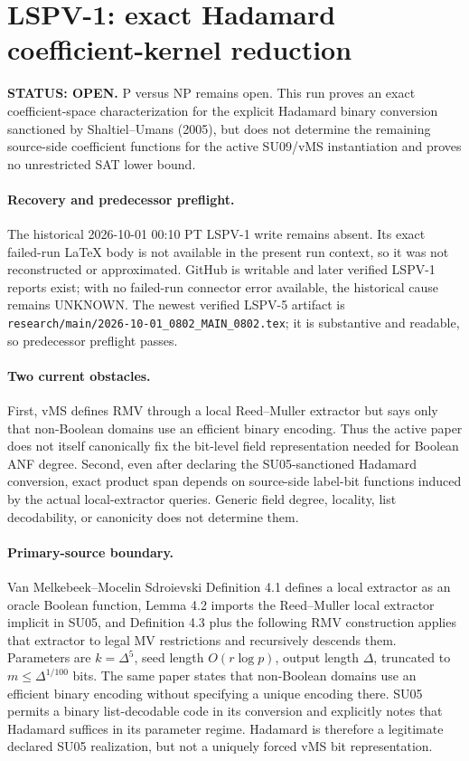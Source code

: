 \documentclass[11pt]{article}
\begin{document}
\section*{LSPV-1: exact Hadamard coefficient-kernel reduction}

\textbf{STATUS: OPEN.} P versus NP remains open. This run proves an exact coefficient-space characterization for the explicit Hadamard binary conversion sanctioned by Shaltiel--Umans (2005), but does not determine the remaining source-side coefficient functions for the active SU09/vMS instantiation and proves no unrestricted SAT lower bound.

\paragraph{Recovery and predecessor preflight.}
The historical 2026-10-01 00:10 PT LSPV-1 write remains absent. Its exact failed-run LaTeX body is not available in the present run context, so it was not reconstructed or approximated. GitHub is writable and later verified LSPV-1 reports exist; with no failed-run connector error available, the historical cause remains UNKNOWN. The newest verified LSPV-5 artifact is \texttt{research/main/2026-10-01\_0802\_MAIN\_0802.tex}; it is substantive and readable, so predecessor preflight passes.

\paragraph{Two current obstacles.}
First, vMS defines RMV through a local Reed--Muller extractor but says only that non-Boolean domains use an efficient binary encoding. Thus the active paper does not itself canonically fix the bit-level field representation needed for Boolean ANF degree. Second, even after declaring the SU05-sanctioned Hadamard conversion, exact product span depends on source-side label-bit functions induced by the actual local-extractor queries. Generic field degree, locality, list decodability, or canonicity does not determine them.

\paragraph{Primary-source boundary.}
Van Melkebeek--Mocelin Sdroievski Definition 4.1 defines a local extractor as an oracle Boolean function, Lemma 4.2 imports the Reed--Muller local extractor implicit in SU05, and Definition 4.3 plus the following RMV construction applies that extractor to legal MV restrictions and recursively descends them. Parameters are $k=\Delta^5$, seed length $O(r\log p)$, output length $\Delta$, truncated to $m\le\Delta^{1/100}$ bits. The same paper states that non-Boolean domains use an efficient binary encoding without specifying a unique encoding there. SU05 permits a binary list-decodable code in its conversion and explicitly notes that Hadamard suffices in its parameter regime. Hadamard is therefore a legitimate declared SU05 realization, but not a uniquely forced vMS bit representation.
\end{document}
